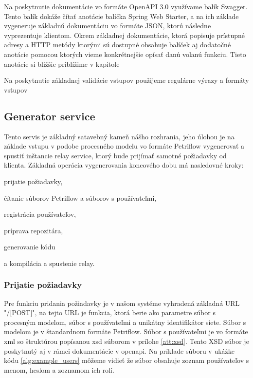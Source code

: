 Na poskytnutie dokumentácie vo formáte OpenAPI 3.0 \cite{openapi3} využívame balík Swagger. Tento balík dokáže čítať anotácie balíčka Spring Web Starter, a na ich základe vygeneruje základnú dokumentáciu vo formáte JSON, ktorú následne vyprezentuje klientom. Okrem základnej dokumentácie, ktorá popisuje prístupné adresy a HTTP metódy ktorými sú dostupné obsahuje balíček aj dodatočné anotácie pomocou ktorých vieme konkrétnejšie opísať danú volanú funkciu. Tieto anotácie si bližšie priblížime v kapitole  



Na poskytnutie základnej validácie vstupov použijeme regulárne výrazy a formáty vstupov 





\subsection{Generator service}  
Tento servis je základný satavebný kameň nášho rozhrania, jeho úlohou je na základe vstupu v podobe procesného modelu vo formáte Petriflow vygenerovať a spustiť inštancie relay service, ktorý bude prijímať samotné požiadavky od klienta. Základná operácia vygenerovania koncového dobu má nasledovné kroky:  

prijatie požiadavky,  

čítanie súborov Petriflow a súborov s používateľmi,  

registrácia používateľov, 

príprava repozitára, 

generovanie kódu  

a kompilácia a spustenie relay. 



\subsubsection{Prijatie požiadavky} 
Pre funkciu pridania požiadavky je v našom systéme vyhradená základná URL "/[POST]", na tejto URL je funkcia, ktorá berie ako parametre súbor s procesným modelom, súbor s používateľmi a unikátny identifikátor siete. Súbor s modelom je v štandardnom formáte Petriflow. Súbor s používateľmi je vo formáte \acrshort{xml} so štruktúrou popísanou \acrshort{xsd} súborom v prílohe \ref{att:xsd}. Tento XSD súbor je poskytnutý aj v rámci dokumentácie v \acrshort{openapi}. Na príklade súboru v ukážke kódu \ref{alg:example_users} môžeme vidieť že súbor obsahuje zoznam používateľov s menom, heslom a zoznamom ich rolí. 

